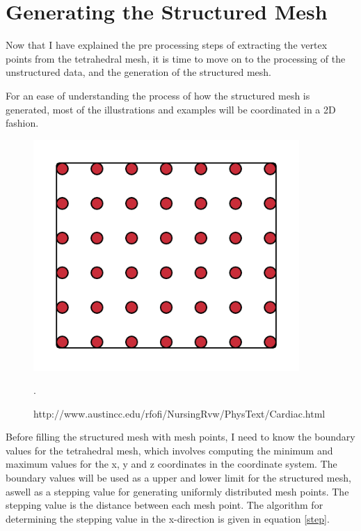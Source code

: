 \section{Generating the Structured Mesh}
\label{generating_the structured_mesh}
Now that I have explained the pre processing steps of extracting the vertex points from the tetrahedral mesh, it is time to move on to the processing of the unstructured data, and the generation of the structured mesh.

For an ease of understanding the process of how the structured mesh is generated, most of the illustrations and examples will be coordinated in a 2D fashion.

\begin{figure}[h]
 \centering 
     \includegraphics[width=0.9\textwidth]{bilder/m_grid_points}
     \caption{http://www.austincc.edu/rfofi/NursingRvw/PhysText/Cardiac.html}.
     \label{m_grid_points.png}
\end{figure}

Before filling the structured mesh with mesh points, I need to know the boundary values for the tetrahedral mesh, which involves computing the minimum and maximum values for the x, y and z coordinates in the coordinate system. The boundary values will be used as a upper and lower limit for the structured mesh, aswell as a stepping value for generating uniformly distributed mesh points. The stepping value is the distance between each mesh point. The algorithm for determining the stepping value in the x-direction is given in equation \ref{step}.

